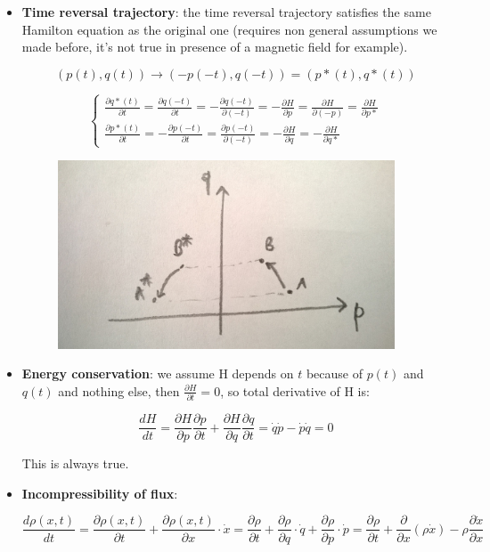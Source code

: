 \documentclass[a4paper, italian, openany]{book}
\begin{document}
\begin{itemize}
\item \textbf{Time reversal trajectory}: the time reversal trajectory satisfies the same Hamilton equation as the original one (requires non general assumptions we made before, it's not true in presence of a magnetic field for example).

$$(p(t), q(t)) \to (-p(-t), q(-t)) = (p*(t), q*(t))$$

$$\begin{cases}
\frac{\partial q*(t)}{\partial t} = \frac{\partial q(-t)}{\partial t} = - \frac{\partial q(-t)}{\partial (-t)} = - \frac{\partial  H}{\partial p} =  \frac{\partial  H}{\partial (-p)} =  \frac{\partial  H}{\partial p*}\\
\frac{\partial p*(t)}{\partial t} = - \frac{\partial p(-t)}{\partial t} = \frac{\partial p(-t)}{\partial (-t)} = - \frac{\partial  H}{\partial q} = - \frac{\partial  H}{\partial q*}
\end{cases}$$

\begin{figure}[H]
\centering
\includegraphics[width=100mm]{img/pic3.jpg}
\end{figure}

\item \textbf{Energy conservation}: we assume H depends on $t$ because of $p(t)$ and $q(t)$ and nothing else, then $\frac{\partial H}{\partial t} = 0$, so total derivative of H is:

$$\frac{dH}{dt} = \frac{\partial H}{\partial p} \frac{\partial p}{\partial t} + \frac{\partial H}{\partial q}\frac{\partial q}{\partial t} = \dot{q}\dot{p} - \dot{p}\dot{q} = 0$$

This is always true.

\item \textbf{Incompressibility of flux}:

$$\frac{d\rho (x, t)}{dt} = \frac{\partial \rho(x, t)}{\partial t} + \frac{\partial \rho(x, t)}{\partial x} \cdot \dot{x} = \frac{\partial \rho}{\partial t} + \frac{\partial \rho}{\partial q} \cdot \dot{q} + \frac{\partial \rho}{\partial p}\cdot \dot{p} = \frac{\partial \rho}{\partial t} + \frac{\partial}{\partial x} (\rho \dot{x} ) - \rho \frac{\partial \dot{x}}{\partial x}$$


\end{itemize}
\end{document}
